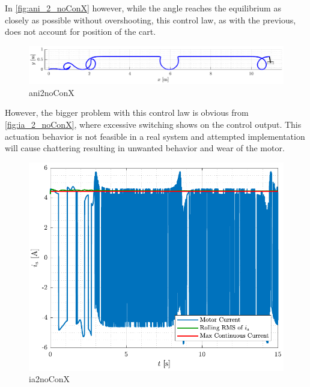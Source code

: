 %
In \autoref{fig:ani_2_noConX} however, while the angle reaches the equilibrium as closely as possible without overshooting, this control law, as with the previous, does not account for position of the cart.
%
\begin{figure}[H]
  \includegraphics[width=1\textwidth]{figures/ani_2_noConX}
  \caption{ani2noConX}
  \label{fig:ani_2_noConX}
\end{figure}
%
However, the bigger problem with this control law is obvious from \autoref{fig:ia_2_noConX}, where excessive switching shows on the control output. This actuation behavior is not feasible in a real system and attempted implementation will cause chattering resulting in unwanted behavior and wear of the motor.
%
\begin{figure}[H]
  \includegraphics[width=.52\textwidth]{figures/ia_2_noConX}
  \caption{ia2noConX}
  \label{fig:ia_2_noConX}
\end{figure}
%
